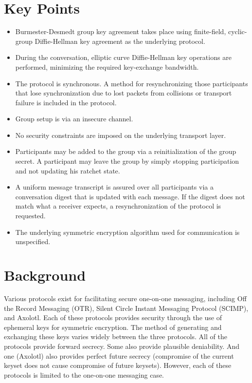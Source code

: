 \documentclass[%
preprint,
amsmath,amssymb,
aps,
prb,
floatfix,
]{revtex4-1}
\begin{document}
\section{\label{sec:keypoints}Key Points}
\begin{itemize}
\item Burmester-Desmedt\cite{ref:burmester} group key agreement
takes place using finite-field, cyclic-group
Diffie-Hellman key agreement as the underlying protocol.
\item During the conversation, elliptic curve Diffie-Hellman key operations
are performed, minimizing the required key-exchange bandwidth.
\item The protocol is synchronous. A method for resynchronizing those
participants that lose synchronization due to lost packets from collisions or
transport failure is included in the protocol.
\item Group setup is via an insecure channel.
\item No security constraints are imposed on the underlying transport layer.
\item Participants may be added to the group via a reinitialization of the
group secret. A participant may leave the group by simply stopping
participation and not updating his ratchet state.
\item A uniform message transcript is assured over all participants via a
conversation digest that is updated with each message. If the digest does not
match what a receiver expects, a resynchronization of the protocol is requested.
\item The underlying symmetric encryption algorithm used for communication is
unspecified.
\end{itemize}

\section{\label{sec:background}Background}
Various protocols exist for facilitating secure one-on-one messaging, including
Off the Record Messaging (OTR)\cite{ref:otr1,ref:raimondo,ref:otr2,ref:otr3,ref:otr}, Silent Circle Instant Messaging Protocol
(SCIMP)\cite{ref:scimp}, and Axolotl\cite{ref:axolotl}. Each of these protocols
provides security through the use of ephemeral keys for symmetric encryption.
The method of generating and exchanging these keys varies widely between the
three protocols. All of the protocols provide forward
secrecy. Some also provide plausible deniability. And one (Axolotl) also
provides perfect future secrecy (compromise of the current keyset does not cause
compromise of future keysets). However, each of these protocols is limited to
the one-on-one messaging case.
\end{document}
